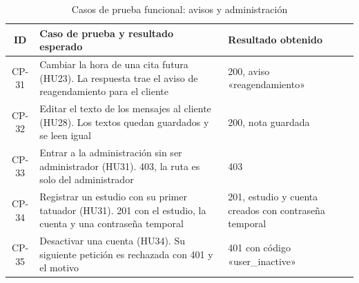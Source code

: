 \begin{table}[H]
  \centering
  \caption{Casos de prueba funcional: avisos y administración}
  \label{tab:casosadmin}
  \renewcommand{\arraystretch}{1.2}
  \footnotesize
  \begin{tabular}{|c|p{5.9cm}|p{5.3cm}|}
    \hline
    \textbf{ID} & \textbf{Caso de prueba y resultado esperado} & \textbf{Resultado obtenido} \\
    \hline
    CP-31 & Cambiar la hora de una cita futura (HU23). La respuesta trae el aviso de reagendamiento para el cliente & 200, aviso «reagendamiento» \\ \hline
    CP-32 & Editar el texto de los mensajes al cliente (HU28). Los textos quedan guardados y se leen igual & 200, nota guardada \\ \hline
    CP-33 & Entrar a la administración sin ser administrador (HU31). 403, la ruta es solo del administrador & 403 \\ \hline
    CP-34 & Registrar un estudio con su primer tatuador (HU31). 201 con el estudio, la cuenta y una contraseña temporal & 201, estudio y cuenta creados con contraseña temporal \\ \hline
    CP-35 & Desactivar una cuenta (HU34). Su siguiente petición es rechazada con 401 y el motivo & 401 con código «user\_inactive» \\ \hline
  \end{tabular}
\end{table}

